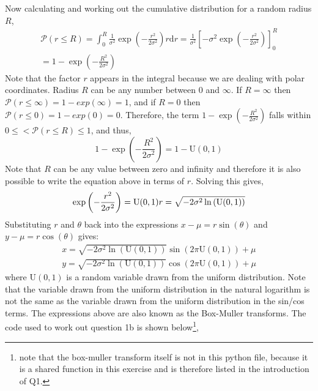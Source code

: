 Now calculating  and working out the cumulative distribution for a random radius $R$,
\begin{gather*}
\mathcal{P}(r \leq R) = \int_0^R \frac{1}{\sigma^2} \exp\left(-\frac{r^2}{2\sigma^2}\right) r\mathrm{d}r = \frac{1}{\sigma^2}\left[-\sigma^2 \exp\left(-\frac{r^2}{2\sigma^2}\right)\right]_0^R\\
= 1- \exp\left(-\frac{R^2}{2\sigma^2}\right)
\end{gather*}
Note that the factor $r$ appears in the integral because we are dealing with polar coordinates.  Radius $R$ can be any number between $0$ and $\infty$. If $R = \infty$ then $\mathcal{P}(r \leq \infty) = 1 - exp\left(\infty\right) = 1$, and if $R = 0$ then $\mathcal{P}(r \leq 0) = 1 - exp\left(0\right) = 0$. Therefore, the term $1 -  \exp\left(-\frac{R^2}{2\sigma^2}\right)$ falls within $0 \leq < \mathcal{P}(r \leq R) \leq 1$, and thus,
\begin{equation*}
1 -  \exp\left(-\frac{R^2}{2\sigma^2}\right) = 1 - \mathrm{U}(0,1)
\end{equation*}
Note that $R$ can be any value between zero and infinity and therefore it is also possible to write the equation above in terms of $r$. Solving this gives,
\begin{equation*}
\exp\left(-\frac{r^2}{2\sigma^2}\right) = \mathrm{U}(0,1)\\
r = \sqrt{-2\sigma^2\ln\left( \mathrm{U}(0,1)\right)}
\end{equation*}
Substituting $r$ and $\theta$ back into the expressions $x-\mu = r\sin(\theta)$ and $y - \mu = r\cos(\theta)$ gives:
\begin{gather}
x = \sqrt{-2\sigma^2\ln\left( \mathrm{U}(0,1)\right)}\sin(2\pi\mathrm{U}(0,1)) + \mu \\
y = \sqrt{-2\sigma^2\ln\left( \mathrm{U}(0,1)\right)}\cos(2\pi\mathrm{U}(0,1)) + \mu
\end{gather}
where $\mathrm{U}(0,1)$ is a random variable drawn from the uniform distribution. Note that the variable drawn from the uniform distribution in the natural logarithm is not the same as the variable drawn from the uniform distribution in the sin/cos terms. 
The expressions above are also known as the Box-Muller transforms.
The code used to work out question 1b is shown below\footnote{note that the box-muller transform itself is not in this python file, because it is a shared function in this exercise and is therefore listed in the introduction of Q1.},




